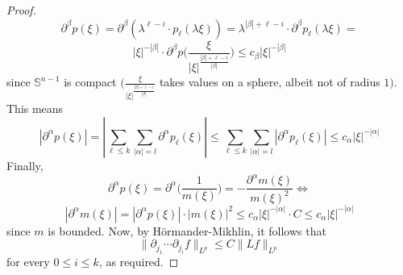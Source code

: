 \documentclass[12pt]{article}
\newenvironment{exercise}[2][Exercise]{\begin{trivlist}
\item[\hskip \labelsep {\bfseries #1}\hskip \labelsep {\bfseries #2.}]}{\end{trivlist}}
\begin{document}
\begin{proof}
  $$
    \partial^\beta p(\xi) =
    \partial^\beta(\lambda^{\ell - i} \cdot p_\ell(\lambda \xi)) =
    \lambda^{|\beta| + \ell -i} \cdot \partial^\beta p_\ell(\lambda \xi)  =
  $$
  $$
    |\xi|^{-|\beta|} \cdot \partial^\beta p \Bigg( \frac{\xi}{|\xi|^{\frac{|\beta| + \ell -i}{|\beta|}}} \Bigg) \le
    c_\beta |\xi|^{-|\beta|}
  $$
  since $\mathbb{S}^{n-1}$ is compact $\Big(\frac{\xi}{|\xi|^{\frac{|\beta| + \ell -i}{|\beta|}}}$ takes values on a sphere, albeit not of radius $1 \Big)$.\\
  This means
  $$
    |\partial^\alpha p(\xi)| =
    |\sum_{\ell \le k} \sum_{|\alpha| = l} \partial^\alpha p_\ell(\xi)| \le
    \sum_{\ell \le k} \sum_{|\alpha| = l} |\partial^\alpha p_\ell(\xi)| \le
    c_\alpha |\xi|^{-|\alpha|}
  $$
  Finally,
  $$
    \partial^\alpha p(\xi) =
    \partial^\alpha \Big( \frac{1}{m(\xi)} \Big) =
    -\dfrac{\partial^\alpha m(\xi)}{m(\xi)^2} \iff
  $$
  $$
    |\partial^\alpha m(\xi)| =
    |\partial^\alpha p(\xi)| \cdot |m(\xi)|^2 \le
    c_\alpha |\xi|^{-|\alpha|} \cdot C \le
    c_\alpha |\xi|^{-|\alpha|}
  $$
  since $m$ is bounded. Now, by Hörmander-Mikhlin, it follows that
  $$
    \|\partial_{j_1} \cdots \partial_{j_i} f\|_{L^p} \le
    C \|Lf\|_{L^p}
  $$
  for every $0 \le i \le k$, as required.
\end{proof}

\begin{exercise}{3}
\end{exercise}
\end{document}
